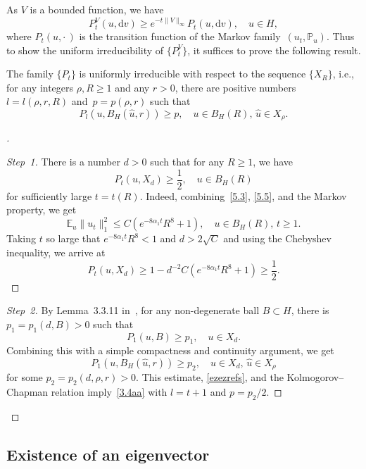 \documentclass[10pt]{amsart}
\theoremstyle{definition}\newtheorem{defi}[theo]{Definition}\newtheorem{rema}[theo]{Remark}\newtheorem{exam}[theo]{Example}\newtheorem{exem}[theo]{Example}\newtheorem{nota}[theo]{Notation}
\newcommand{\IP}{{\mathbb P}}
\newcommand{\E}{{\mathbb E}}
\newcommand{\dd}{\mathrm{d}}
\newenvironment{step}{\begin{proof}}{\let\qed\relax \end{proof}}
\newenvironment{proofc}[1][\proofname]{\begin{proof}[{#1}]}{\end{proof}}
\begin{document}
As $V$ is a bounded function, we have
\[
P_t^V(u,\dd v)\ge e^{-t\|V\|_\infty}P_t(u,\dd v),\quad\mbox{$u\in H$},
\]
where $P_t(u,{\cdot\,})$ is the transition function of the Markov family~$(u_t,\IP_u)$.
Thus to show the uniform irreducibility of $\{P^V_t\} $, it suffices to prove the following result.

\begin{prop}\label{P:2.7}
The family $\{P_t\} $ is uniformly irreducible with respect to the sequence $\{X_R\}$, i.e., for any integers $\rho, R\ge1$ and any $r>0$, there are positive numbers $l=l(\rho,r,R)$ and~$p=p(\rho,r)$ such that
\begin{equation}\label{3.4aa}
P_l(u,B_{H}(\hat u,r))\ge p,\quad\mbox{$u\in B_H(R),\,\hat u\in X_\rho$}.
\end{equation}
\end{prop}

\begin{proofc}

\begin{step}[Step~1]
There is a number $d>0$ such that for any $R\ge1$, we have
\begin{equation}\label{ezezrefs}
P_t(u, X_{d})\ge\frac12, \quad\mbox{$u\in B_H(R)$}
\end{equation}
for sufficiently large $t=t(R)$. Indeed, combining~\eqref{5.3}, \eqref{5.5}, and the Markov property, we get
\[
\E_u \|u_t\|_1^{2}\le C(e^{-8\alpha_1 t} R^{8}+1),\quad\mbox{$u\in B_H(R)$, $t\ge1$}.
\]
Taking $t$ so large that $e^{-8\alpha_1 t} R^{8}<1$ and $d >2\sqrt{ C} $ and using the Chebyshev inequality, we arrive at
\[
P_t(u, X_{d})\ge 1- d^{-2}C(e^{-8\alpha_1 t} R^{8}+1) \ge \frac12.
\]
\end{step}

\begin{proof}[Step~2]
By Lemma~3.3.11 in~\cite{KS-book}, for any non-degenerate ball $B \subset H$, there is~$p_1= p_1(d,B)>0$ such that
\[
P_1(u, B)\ge p_1,\quad\mbox{$u\in X_{d}$}.
\]
Combining this with a simple compactness and continuity argument, we get
\[
P_1(u, B_{H}(\hat u,r))\ge p_2,\quad\mbox{$u\in X_{d},\, \hat u\in X_\rho$}
\]
for some $p_2=p_2(d,\rho,r)>0$. This estimate, \eqref{ezezrefs}, and the Kolmogorov--Chapman relation imply~\eqref{3.4aa} with $l=t+1$ and $p=p_2/2$.
\end{proof}
\let\qed\relax
\end{proofc}

\subsection{Existence of an eigenvector}\label{S:2.4}
\end{document}
